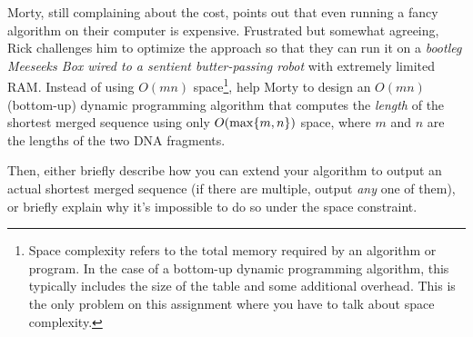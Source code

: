 \documentclass[11pt,addpoints,answers]{exam}
\begin{document}
\begin{questions}
\begin{parts}
        \begin{solution} \end{solution}

        \bonuspart[3] Morty, still complaining about the cost, points out that even running a fancy algorithm on their computer is expensive. 
        Frustrated but somewhat agreeing, Rick challenges him to optimize the approach so that they can run it on a \emph{bootleg Meeseeks Box wired to a sentient butter-passing robot} with extremely limited RAM. Instead of using $O(mn)$ space\footnote{Space complexity refers to the total memory required by an algorithm or program. In the case of a bottom-up dynamic programming algorithm, this typically includes the size of the table and some additional overhead. This is the only problem on this assignment where you have to talk about space complexity.}, help Morty to design an $O(mn)$ (bottom-up) dynamic programming algorithm that computes the \emph{length} of the shortest merged sequence using only $O(\max \{m,n\})$ space, where $m$ and $n$ are the lengths of the two DNA fragments. 

        Then, either briefly describe how you can extend your algorithm to output an actual shortest merged sequence (if there are multiple, output \emph{any} one of them), or briefly explain why it's impossible to do so under the space constraint. \label{DNA-alg}
        
        \label{SCS-alg}
            
        \begin{solution}

        \end{solution}

        \end{parts}

\end{questions}
\end{document}
